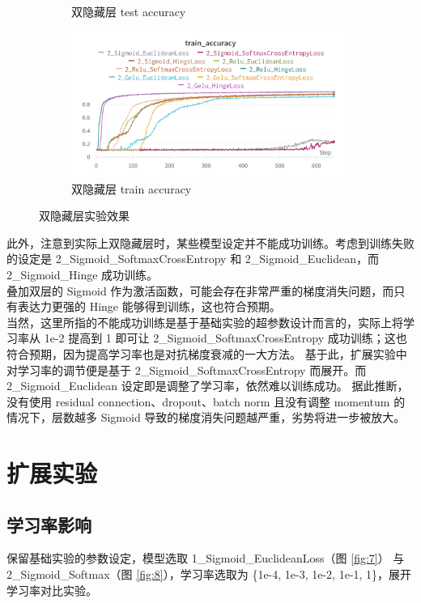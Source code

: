 \documentclass{article}
\begin{document}
\begin{figure}[htbp]
\begin{subfigure}{0.475\textwidth}
		\caption{双隐藏层 test accuracy}
	\end{subfigure}
	\begin{subfigure}{0.475\textwidth}
		\centering
		\includegraphics[width=1\textwidth]{../pics/双层实验-train_acc.png}
		\caption{双隐藏层 train accuracy}
	\end{subfigure}
	\caption{双隐藏层实验效果}
	\label{fig:6}
\end{figure}

此外，注意到实际上双隐藏层时，某些模型设定并不能成功训练。考虑到训练失败的设定是 2\_Sigmoid\_SoftmaxCrossEntropy 和 2\_Sigmoid\_Euclidean，而 2\_Sigmoid\_Hinge 成功训练。\\
叠加双层的 Sigmoid 作为激活函数，可能会存在非常严重的梯度消失问题，而只有表达力更强的 Hinge 能够得到训练，这也符合预期。\\
当然，这里所指的不能成功训练是基于基础实验的超参数设计而言的，实际上将学习率从 1e-2 提高到 1 即可让 2\_Sigmoid\_SoftmaxCrossEntropy 成功训练；这也符合预期，因为提高学习率也是对抗梯度衰减的一大方法。
基于此，扩展实验中对学习率的调节便是基于 2\_Sigmoid\_SoftmaxCrossEntropy 而展开。而 2\_Sigmoid\_Euclidean 设定即是调整了学习率，依然难以训练成功。
据此推断，没有使用 residual connection、dropout、batch norm 且没有调整 momentum 的情况下，层数越多 Sigmoid 导致的梯度消失问题越严重，劣势将进一步被放大。

\section{扩展实验}

\subsection{学习率影响}

保留基础实验的参数设定，模型选取 1\_Sigmoid\_EuclideanLoss（图 \ref{fig:7}） 与 2\_Sigmoid\_Softmax（图 \ref{fig:8}），学习率选取为 \{1e-4, 1e-3, 1e-2, 1e-1, 1\}，展开学习率对比实验。
\end{document}
